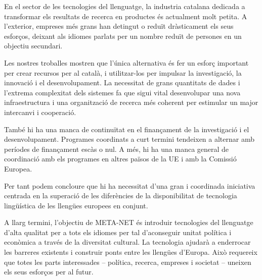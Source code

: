 \begin{multicols}{2}
En el sector de les tecnologies del llenguatge, la industria catalana dedicada a transformar els resultats de recerca en productes és actualment molt petita. A l'exterior, empreses més grans han detingut o reduït dràsticament els seus esforços, deixant als idiomes parlats per un nombre reduït de persones en un objectiu secundari.

Les nostres troballes mostren que l'única alternativa és fer un esforç important per crear recursos per al català, i utilitzar-los per impulsar la investigació, la innovació i el desenvolupament. La necessitat de grans quantitats de dades i l'extrema complexitat dels sistemes fa que sigui vital desenvolupar una nova infraestructura i una organització de recerca més coherent per estimular un major intercanvi i cooperació.

També hi ha una manca de continuïtat en el finançament de la investigació i el desenvolupament. Programes coordinats a curt termini tendeixen a alternar amb períodes de finançament escàs o nul. A més, hi ha una manca general de coordinació amb els programes en altres països de la UE i amb la Comissió Europea.

Per tant podem concloure que hi ha necessitat d'una gran i coordinada iniciativa centrada en la superació de les diferències de la disponibilitat de tecnologia lingüística de les llengües europees en conjunt.


A llarg termini, l’objectiu de META-NET és introduir tecnologies del llenguatge d'alta qualitat per a tots els idiomes per tal d'aconseguir unitat política i econòmica a través de la diversitat cultural. La tecnologia ajudarà a enderrocar les barreres existents i construir ponts entre les llengües d'Europa. Això requereix que totes les parts interessades -- política, recerca, empreses i societat -- uneixen els seus esforços per al futur.


\end{multicols}
